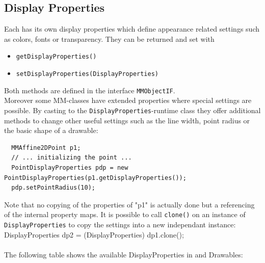   \subsection{Display Properties}
  Each \mmo has its own display properties which define appearance related settings such as colors,
  fonts or transparency. They can be returned and set with
  \begin{itemize}
    \item \verb|getDisplayProperties()|
    \item \verb|setDisplayProperties(DisplayProperties)|
  \end{itemize}
  Both methods are defined in the interface \verb|MMObjectIF|.\\
  Moreover some MM-classes have extended properties where special settings are
  possible. By casting to the \verb|DisplayProperties|-runtime class they offer additional methods to
  change other useful settings such as the line width, point radius or the basic shape of a drawable:\\
  \begin{footnotesize}
  \begin{verbatim}
  MMAffine2DPoint p1;
  // ... initializing the point ...
  PointDisplayProperties pdp = new PointDisplayProperties(p1.getDisplayProperties());
  pdp.setPointRadius(10);
  \end{verbatim}
  \end{footnotesize}
  Note that no copying of the properties of "p1" is actually done but a referencing of the internal property maps.
  It is possible to call \verb|clone()| on an instance of \verb|DisplayProperties| to copy the settings
  into a new independant instance:\\
  {\small\ttfamily
    DisplayProperties dp2 = (DisplayProperties) dp1.clone();\\
  }
  \\
  The following table shows the available DisplayProperties in \mmos and Drawables:\\\\
